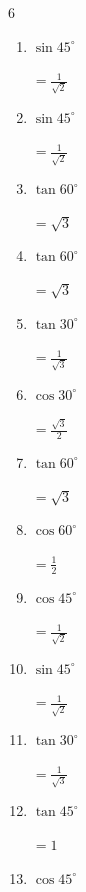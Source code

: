 \begin{multicols}{6}
\begin{enumerate}
        $\displaystyle =\frac{\sqrt{3}}{2}$

  \item $\displaystyle \sin{45^\circ}$

        $\displaystyle =\frac{1}{\sqrt{2}}$

  \item $\displaystyle \sin{45^\circ}$

        $\displaystyle =\frac{1}{\sqrt{2}}$

  \item $\displaystyle \tan{60^\circ}$

        $\displaystyle =\sqrt{3}$

  \item $\displaystyle \tan{60^\circ}$

        $\displaystyle =\sqrt{3}$

\columnbreak %

  \item $\displaystyle \tan{30^\circ}$

        $\displaystyle =\frac{1}{\sqrt{3}}$

  \item $\displaystyle \cos{30^\circ}$

        $\displaystyle =\frac{\sqrt{3}}{2}$

  \item $\displaystyle \tan{60^\circ}$

        $\displaystyle =\sqrt{3}$

  \item $\displaystyle \cos{60^\circ}$

        $\displaystyle =\frac{1}{2}$

  \item $\displaystyle \cos{45^\circ}$

        $\displaystyle =\frac{1}{\sqrt{2}}$

  \item $\displaystyle \sin{45^\circ}$

        $\displaystyle =\frac{1}{\sqrt{2}}$

  \item $\displaystyle \tan{30^\circ}$

        $\displaystyle =\frac{1}{\sqrt{3}}$

  \item $\displaystyle \tan{45^\circ}$

        $\displaystyle =1$

  \item $\displaystyle \cos{45^\circ}$


\end{enumerate}
\end{multicols}
